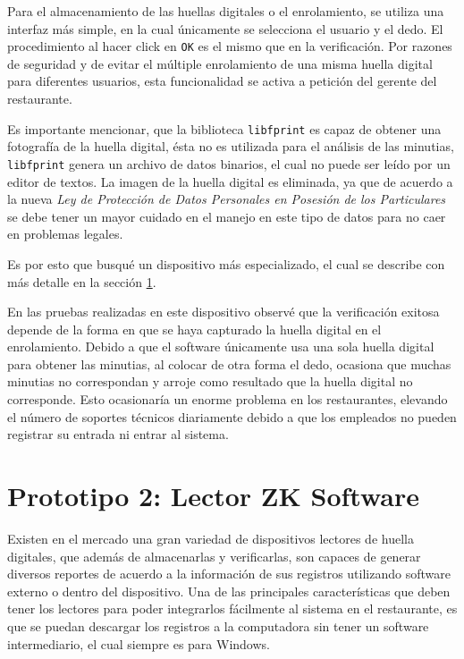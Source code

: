 Para el almacenamiento de las huellas digitales o el enrolamiento, se utiliza una interfaz más simple, en la cual únicamente se selecciona el usuario y el dedo. El procedimiento al hacer click en \texttt{OK} es el mismo que en la verificación. Por razones de seguridad y de evitar el múltiple enrolamiento de una misma huella digital para diferentes usuarios, esta funcionalidad se activa a petición del gerente del restaurante.

Es importante mencionar, que la biblioteca \texttt{libfprint} es capaz de obtener una fotografía de la huella digital, ésta no es utilizada para el análisis de las minutias, \texttt{libfprint} genera un archivo de datos binarios, el cual no puede ser leído por un editor de textos. La imagen de la huella digital es eliminada, ya que de acuerdo a la nueva \textit{Ley de Protección de Datos Personales en Posesión de los Particulares} se debe tener un mayor cuidado en el manejo en este tipo de datos para no caer en problemas legales.

Es por esto que busqué un dispositivo más especializado, el cual se describe con más detalle en la sección \ref{sec:lector_zksoftware}.

En las pruebas realizadas en este dispositivo observé que la verificación exitosa depende de la forma en que se haya capturado la huella digital en el enrolamiento. Debido a que el software únicamente usa una sola huella digital para obtener las minutias, al colocar de otra forma el dedo, ocasiona que muchas minutias no correspondan y arroje como resultado que la huella digital no corresponde. Esto ocasionaría un enorme problema en los restaurantes, elevando el número de soportes técnicos diariamente debido a que los empleados no pueden registrar su entrada ni entrar al sistema.

\section{Prototipo 2: Lector ZK Software}
\label{sec:lector_zksoftware}

Existen en el mercado una gran variedad de dispositivos lectores de huella digitales, que además de almacenarlas y verificarlas, son capaces de generar diversos reportes de acuerdo a la información de sus registros utilizando software externo o dentro del dispositivo. Una de las principales características que deben tener los lectores para poder integrarlos fácilmente al sistema en el restaurante, es que se puedan descargar los registros a la computadora sin tener un software intermediario, el cual siempre es para Windows. 

